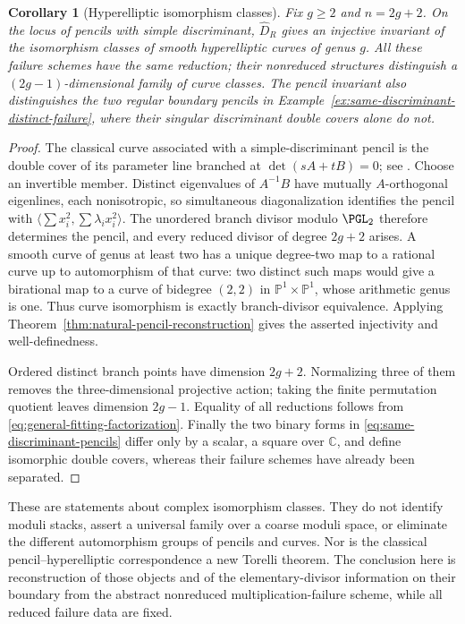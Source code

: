 \documentclass[11pt,reqno]{amsart}
\numberwithin{equation}{section}
\newtheorem{corollary}[theorem]{Corollary}
\theoremstyle{definition}\newtheorem{definition}[theorem]{Definition}
\theoremstyle{remark}\newtheorem{remark}[theorem]{Remark}
\newcommand{\C}{\mathbb C}\newcommand{\Q}{\mathbb Q}
\newcommand{\Pj}{\mathbb P}\newcommand{\A}{\mathbb A}
\begin{document}
\begin{corollary}[Hyperelliptic isomorphism classes]
\label{cor:hyperelliptic-failure-invariant}
Fix \(g\ge2\) and \(n=2g+2\).  On the locus of pencils with
simple discriminant, \(\widehat D_R\) gives an injective invariant
of the isomorphism classes of smooth hyperelliptic curves of genus
\(g\).  All these failure schemes have the same reduction; their
nonreduced structures distinguish a \((2g-1)\)-dimensional family
of curve classes.  The pencil invariant also distinguishes the two
regular boundary pencils in
Example~\ref{ex:same-discriminant-distinct-failure}, where their
singular discriminant double covers alone do not.
\end{corollary}
\begin{proof}
The classical curve associated with a simple-discriminant pencil is
the double cover of its parameter line branched at
\(\det(sA+tB)=0\); see \cite[\S4.2, equation (4.3)]{SmithQuadrics}.
Choose an invertible member.  Distinct eigenvalues of \(A^{-1}B\)
have mutually \(A\)-orthogonal eigenlines, each nonisotropic, so
simultaneous diagonalization identifies the pencil with
\(\langle\sum x_i^2,\sum\lambda_i x_i^2\rangle\).
The unordered branch divisor modulo \(\PGL_2\) therefore
determines the pencil, and every reduced divisor of degree \(2g+2\)
arises.  A smooth curve of genus at least two has a unique degree-two
map to a rational curve up to automorphism of that curve: two distinct
such maps would give a birational map to a curve of bidegree \((2,2)\)
in \(\Pj^1\times\Pj^1\), whose arithmetic genus is one.
Thus curve isomorphism is exactly branch-divisor equivalence.
Applying Theorem~\ref{thm:natural-pencil-reconstruction} gives the
asserted injectivity and well-definedness.

Ordered distinct branch points have dimension \(2g+2\).
Normalizing three of them removes the three-dimensional projective
action; taking the finite permutation quotient leaves dimension
\(2g-1\).  Equality of all reductions follows from
\eqref{eq:general-fitting-factorization}.  Finally the two binary
forms in \eqref{eq:same-discriminant-pencils} differ only by a
scalar, a square over \(\C\), and define isomorphic double covers,
whereas their failure schemes have already been separated.
\end{proof}

These are statements about complex isomorphism classes.  They do not
identify moduli stacks, assert a universal family over a coarse moduli
space, or eliminate the different automorphism groups of pencils and
curves.  Nor is the classical pencil--hyperelliptic correspondence a
new Torelli theorem.  The conclusion here is reconstruction of those
objects and of the elementary-divisor information on their boundary
from the abstract nonreduced multiplication-failure scheme, while all
reduced failure data are fixed.
\end{document}

